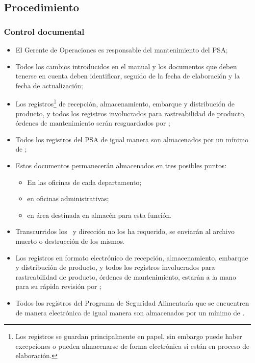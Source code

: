 \subsection{Procedimiento}
\subsubsection{Control documental}

\begin{itemize}
	\item El Gerente de Operaciones es responsable del mantenimiento del \gls{PSA};
	\item Todos los cambios introducidos en el manual y los documentos que deben tenerse en cuenta deben identificar, seguido de la fecha de elaboración y la fecha de actualización;
	\item Los registros\footnote{Los registros se guardan principalmente en papel, sin embargo puede haber excepciones o pueden almacenarse de forma electrónica si están en proceso de elaboración.} de recepción, almacenamiento, embarque y distribución de producto, y todos los registros involucrados para rastreabilidad de producto, órdenes de mantenimiento serán resguardados por \VigenciaAlmacRegistros;
	\item Todos los registros del \gls{PSA} de igual manera son almacenados por un mínimo de \VigenciaAlmacRegistros;
	\item Estos documentos permanecerán almacenados en tres posibles puntos:
	\begin{itemize}
		\item En las oficinas de cada departamento;
		\item en oficinas administrativas;
		\item en área destinada en almacén para esta función.
	\end{itemize}
	\item Transcurridos los \VigenciaAlmacRegistros\ y dirección no los ha requerido, se enviarán al archivo muerto o destrucción de los mismos.
	\item Los registros en formato electrónico de recepción, almacenamiento, embarque y distribución de producto, y todos los registros involucrados para rastreabilidad de producto, órdenes de mantenimiento, estarán a la mano para su rápida revisión por \VigenciaAlmacRegistrosElec;
	\item Todos los registros del Programa de Seguridad Alimentaria que se encuentren de manera electrónica de igual manera son almacenados por un mínimo de \VigenciaAlmacRegistrosElec.

\end{itemize}
